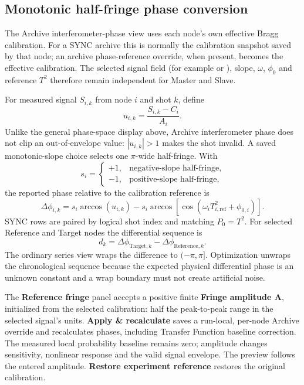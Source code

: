 \documentclass[11pt,oneside,openany]{book}
\newcommand{\code}[1]{\texttt{\detokenize{#1}}}
\newcommand{\ui}[1]{\textbf{#1}}
\begin{document}
\subsection{Monotonic half-fringe phase conversion}
The Archive interferometer-phase view uses each node's own effective Bragg calibration.
For a SYNC archive this is normally the calibration snapshot saved by that node; an
archive phase-reference override, when present, becomes the effective calibration. The
selected signal field (for example \code{intf_p1} or \code{intf_p1_nofit}), slope,
$\omega$, $\phi_0$ and reference $T^2$ therefore remain independent for Master and Slave.

For measured signal $S_{i,k}$ from node $i$ and shot $k$, define
\begin{equation}
  u_{i,k}=\frac{S_{i,k}-C_i}{A_i}.
\end{equation}
Unlike the general phase-space display above, Archive interferometer phase does not clip
an out-of-envelope value: $|u_{i,k}|>1$ makes the shot invalid. A saved monotonic-slope
choice selects one $\pi$-wide half-fringe. With
\begin{equation}
  s_i=\begin{cases}
    +1,&\text{negative-slope half-fringe},\\
    -1,&\text{positive-slope half-fringe},
  \end{cases}
\end{equation}
the reported phase relative to the calibration reference is
\begin{equation}
  \Delta\phi_{i,k}
  =s_i\arccos(u_{i,k})
  -s_i\arccos\!\left[\cos\!\left(\omega_iT_{i,\mathrm{ref}}^2+\phi_{0,i}\right)\right].
  \label{eq:archive-phase}
\end{equation}
SYNC rows are paired by logical shot index and matching $P_0=T^2$. For selected Reference
and Target nodes the differential sequence is
\begin{equation}
  d_k=\Delta\phi_{\mathrm{Target},k}-\Delta\phi_{\mathrm{Reference},k}.
\end{equation}
The ordinary series view wraps the difference to $(-\pi,\pi]$. Optimization unwraps the
chronological sequence because the expected physical differential phase is an unknown
constant and a wrap boundary must not create artificial noise.

The \ui{Reference fringe} panel accepts a positive finite \ui{Fringe amplitude A},
initialized from the selected calibration: half the peak-to-peak range in the selected
signal's units. \ui{Apply \& recalculate} saves a run-local, per-node Archive override
and recalculates phases, including Transfer Function baseline correction. The measured
local probability baseline remains zero; amplitude changes sensitivity, nonlinear response
and the valid signal envelope. The preview follows the entered amplitude.
\ui{Restore experiment reference} restores the original calibration.
\end{document}
